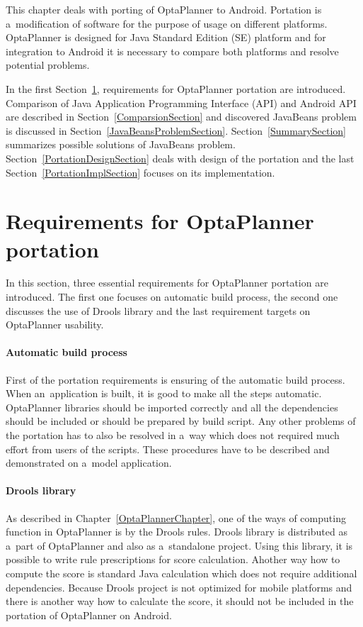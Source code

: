This chapter deals with porting of OptaPlanner to Android. Portation is a~modification of software for the purpose of
usage on different platforms. OptaPlanner is designed for Java Standard Edition (SE) platform and for integration to
Android it is necessary to compare both platforms and resolve potential problems.

In the first Section~\ref{RequirementsPortationSection}, requirements for OptaPlanner portation are introduced.
Comparison of Java Application Programming Interface (API) and Android API are described in
Section~\ref{ComparsionSection} and discovered JavaBeans problem is discussed in Section~\ref{JavaBeansProblemSection}.
Section~\ref{SummarySection} summarizes possible solutions of JavaBeans problem. Section~\ref{PortationDesignSection}
deals with design of the portation and the last Section~\ref{PortationImplSection} focuses on its implementation.

\section{Requirements for OptaPlanner portation}\label{RequirementsPortationSection}
In this section, three essential requirements for OptaPlanner portation are introduced. The first one focuses on
automatic build process, the second one discusses the use of Drools library and the last requirement targets on
OptaPlanner usability.

\paragraph{Automatic build process}
First of the portation requirements is ensuring of the automatic build process. When an~application is built, it is
good to make all the steps automatic. OptaPlanner libraries should be imported correctly and all the dependencies should
be included or should be prepared by build script. Any other problems of the portation has to also be resolved in a~way
which does not required much effort from users of the scripts. These procedures have to be described and demonstrated on
a~model application.

\paragraph{Drools library}
As described in Chapter~\ref{OptaPlannerChapter}, one of the ways of computing function in OptaPlanner is by the Drools
rules. Drools library is distributed as a~part of OptaPlanner and also as a~standalone project. Using this library, it
is possible to write rule prescriptions for score calculation. Ahother way how to compute the score is standard Java
calculation which does not require additional dependencies. Because Drools project is not optimized for mobile platforms
and there is another way how to calculate the score, it should not be included in the portation of OptaPlanner on
Android.

